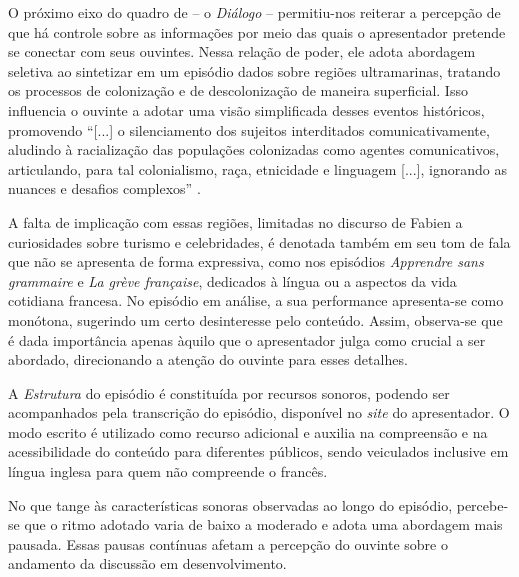 \documentclass[portuguese]{textolivre}
\begin{document}
O próximo eixo do quadro de \textcite{kalantzis_letramentos_2020} – o \emph{Diálogo} – permitiu-nos reiterar a percepção de que há controle sobre as informações por meio das quais o apresentador pretende se conectar com seus ouvintes. Nessa relação de poder, ele adota abordagem seletiva ao sintetizar em um episódio dados sobre regiões ultramarinas, tratando os processos de colonização e de descolonização de maneira superficial. Isso influencia o ouvinte a adotar uma visão simplificada desses eventos históricos, promovendo “[...] o silenciamento dos sujeitos interditados comunicativamente, aludindo à racialização das populações colonizadas como agentes comunicativos, articulando, para tal colonialismo, raça, etnicidade e linguagem [...], ignorando as nuances e desafios complexos” \cite[p. 33-58]{veronelli_sobre_2021}.

A falta de implicação com essas regiões, limitadas no discurso de Fabien a curiosidades sobre turismo e celebridades, é denotada também em seu tom de fala que não se apresenta de forma expressiva, como nos episódios \textit{Apprendre sans grammaire} e \textit{La grève française}, dedicados à língua ou a aspectos da vida cotidiana francesa. No episódio em análise, a sua performance apresenta-se como monótona, sugerindo um certo desinteresse pelo conteúdo. Assim, observa-se que é dada importância apenas àquilo que o apresentador julga como crucial a ser abordado, direcionando a atenção do ouvinte para esses detalhes.

A \emph{Estrutura} do episódio é constituída por recursos sonoros, podendo ser acompanhados pela transcrição do episódio, disponível no \textit{site} do apresentador. O modo escrito é utilizado como recurso adicional e auxilia na compreensão e na acessibilidade do conteúdo para diferentes públicos, sendo veiculados inclusive em língua inglesa para quem não compreende o francês.

No que tange às características sonoras observadas ao longo do episódio, percebe-se que o ritmo adotado varia de baixo a moderado e adota uma abordagem mais pausada. Essas pausas contínuas afetam a percepção do ouvinte sobre o andamento da discussão em desenvolvimento.
\end{document}

